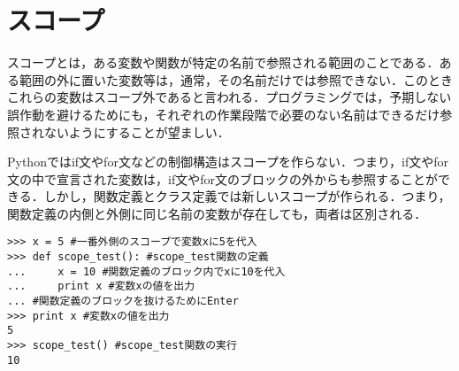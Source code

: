 \section{スコープ}
スコープとは，ある変数や関数が特定の名前で参照される範囲のことである．ある範囲の外に置いた変数等は，通常，その名前だけでは参照できない．このときこれらの変数はスコープ外であると言われる．プログラミングでは，予期しない誤作動を避けるためにも，それぞれの作業段階で必要のない名前はできるだけ参照されないようにすることが望ましい．


Pythonではif文やfor文などの制御構造はスコープを作らない．つまり，if文やfor文の中で宣言された変数は，if文やfor文のブロックの外からも参照することができる．しかし，関数定義とクラス定義では新しいスコープが作られる．つまり，関数定義の内側と外側に同じ名前の変数が存在しても，両者は区別される．


\begin{lstlisting}[caption=スコープ,label=scope]
>>> x = 5 #一番外側のスコープで変数xに5を代入
>>> def scope_test(): #scope_test関数の定義
...     x = 10 #関数定義のブロック内でxに10を代入
...     print x #変数xの値を出力
... #関数定義のブロックを抜けるためにEnter
>>> print x #変数xの値を出力
5
>>> scope_test() #scope_test関数の実行
10
\end{lstlisting}

